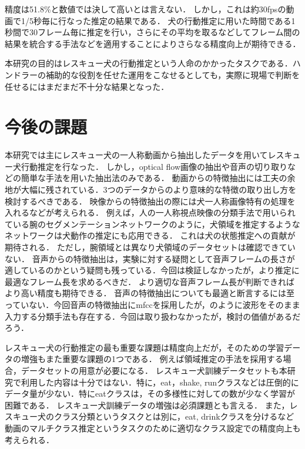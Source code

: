 精度は51.8\%と数値では決して高いとは言えない．
しかし，これは約30fpsの動画で1/5秒毎に行なった推定の結果である．
犬の行動推定に用いた時間である1秒間で30フレーム毎に推定を行い，さらにその平均を取るなどしてフレーム間の結果を統合する手法などを適用することによりさらなる精度向上が期待できる．

本研究の目的はレスキュー犬の行動推定という人命のかかったタスクである．ハンドラーの補助的な役割を任せた運用をこなせるとしても，実際に現場で判断を任せるにはまだまだ不十分な結果となった．




\section{今後の課題}
本研究では主にレスキュー犬の一人称動画から抽出したデータを用いてレスキュー犬行動推定を行なった．
しかし，optical flow画像の抽出や音声の切り取りなどの簡単な手法を用いた抽出法のみである．
動画からの特徴抽出には工夫の余地が大幅に残されている．3つのデータからのより意味的な特徴の取り出し方を検討するべきである．
映像からの特徴抽出の際には犬一人称画像特有の処理を入れるなどが考えられる．
例えば，人の一人称視点映像の分類手法\cite{minghuang2016fpar}で用いられている腕のセグメンテーションネットワークのように，犬領域を推定するようなネットワークは犬動作の推定にも応用できる．
これは犬の状態推定への貢献が期待される．
ただし，腕領域とは異なり犬領域のデータセットは確認できていない．
音声からの特徴抽出は，実験に対する疑問として音声フレームの長さが適しているのかという疑問も残っている．今回は検証しなかったが，より推定に最適なフレーム長を求めるべきだ．
より適切な音声フレーム長が判断できればより高い精度も期待できる．
音声の特徴抽出についても最適と断言するには至っていない．今回音声の特徴抽出にmfccを採用したが，\cite{aytar2016soundnet}のように波形をそのまま入力する分類手法も存在する．今回は取り扱わなかったが，検討の価値があるだろう．

レスキュー犬の行動推定の最も重要な課題は精度向上だが，そのための学習データの増強もまた重要な課題の1つである．
例えば領域推定の手法を採用する場合，データセットの用意が必要になる．
レスキュー犬訓練データセットも本研究で利用した内容は十分ではない．特に，eat，shake, runクラスなどは圧倒的にデータ量が少ない．特にeatクラスは，その多様性に対しての数が少なく学習が困難である．
レスキュー犬訓練データの増強は必須課題とも言える．
また，レスキュー犬のクラス分類というタスクとは別に，eat, drinkクラスを分けるなど動画のマルチクラス推定というタスクのために適切なクラス設定での精度向上も考えられる．

